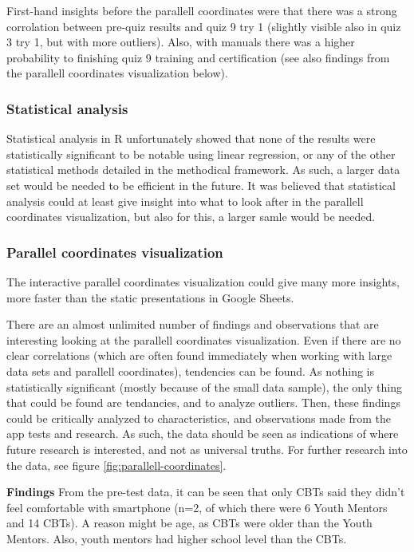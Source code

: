 First-hand insights before the parallell coordinates were that there was a strong corrolation between pre-quiz results and quiz 9 try 1 (slightly visible also in quiz 3 try 1, but with more outliers). Also, with manuals there was a higher probability to finishing quiz 9 training and certification (see also findings from the parallell coordinates visualization below).

\subsubsection{Statistical analysis}
Statistical analysis in R unfortunately showed that none of the results were statistically significant to be notable using linear regression, or any of the other statistical methods detailed in the methodical framework. As such, a larger data set would be needed to be efficient in the future. It was believed that statistical analysis could at least give insight into what to look after in the parallell coordinates visualization, but also for this, a larger samle would be needed.

\subsubsection{Parallel coordinates visualization}
The interactive parallel coordinates visualization could give many more insights, more faster than the static presentations in Google Sheets.

There are an almost unlimited number of findings and observations that are interesting looking at the parallell coordinates visualization. Even if there are no clear correlations (which are often found immediately when working with large data sets and parallell coordinates), tendencies can be found. As nothing is statistically significant (mostly because of the small data sample), the only thing that could be found are tendancies, and to analyze outliers. Then, these findings could be critically analyzed to characteristics, and observations made from the app tests and research. As such, the data should be seen as indications of where future research is interested, and not as universal truths. For further research into the data, see figure \ref{fig:parallell-coordinates}.

\textbf{Findings}
From the pre-test data, it can be seen that only CBTs said they didn't feel comfortable with smartphone (n=2, of which there were 6 Youth Mentors and 14 CBTs). A reason might be age, as CBTs were older than the Youth Mentors. Also, youth mentors had higher school level than the CBTs.

